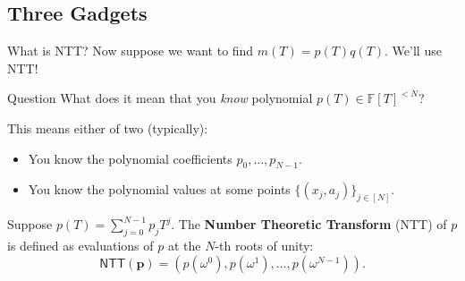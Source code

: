 \documentclass{zkdl-presentation-template}
\begin{document}
    \subsection{Three Gadgets}
    \begin{frame}{What is NTT?}
        Now suppose we want to find $m(T) = p(T)q(T)$. We'll use NTT!
        \pause

        \begin{questionblock}{Question}
            What does it mean that you \emph{know} polynomial $p(T) \in \mathbb{F}[T]^{< N}$?
        \end{questionblock}
        \pause

        This means either of two (typically):
        \begin{itemize}
            \item You know the polynomial coefficients $p_0,\dots,p_{N-1}$.\pause
            \item You know the polynomial values at some points $\{(x_j,a_j)\}_{j \in [N]}$.
        \end{itemize}
        \pause

        \begin{definition}[NTT]
            Suppose $p(T) = \sum_{j=0}^{N-1}p_jT^j$. The \textbf{Number Theoretic Transform} (NTT) of $p$ is defined as evaluations of $p$ at the $N$-th roots of unity:
            \begin{equation*}
                \mathsf{NTT}(\mathbf{p}) = \left(p(\omega^0), p(\omega^1), \dots, p(\omega^{N-1})\right).
            \end{equation*}
        \end{definition}
    \end{frame}
\end{document}
